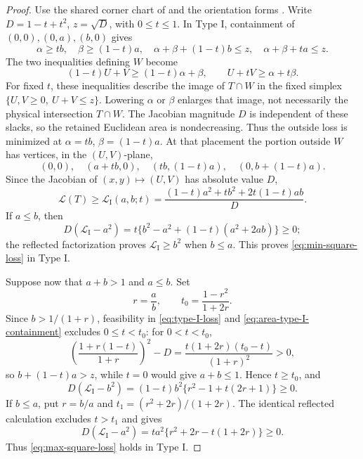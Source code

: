\begin{proof}
Use the shared corner chart of  and the
orientation forms .
Write $D=1-t+t^2$, $z=\sqrt D$, with $0\le t\le1$.
In Type I, containment of
$(0,0),(0,a),(b,0)$ gives
\begin{equation}
 \alpha\ge tb,\quad \beta\ge(1-t)a,
 \quad \alpha+\beta+(1-t)b\le z,
 \quad \alpha+\beta+ta\le z.                 \label{eq:area-type-I-containment}
\end{equation}
The two inequalities defining $W$ become
\[
 (1-t)U+V\ge(1-t)\alpha+\beta,
 \qquad U+tV\ge\alpha+t\beta.
\]
For fixed $t$, these inequalities describe the image of $T\cap W$ in the
fixed simplex $\{U,V\ge0,\ U+V\le z\}$. Lowering $\alpha$ or $\beta$
enlarges that image, not necessarily the physical intersection $T\cap W$.
The Jacobian magnitude $D$ is independent of these slacks, so the retained
Euclidean area is nondecreasing. Thus the outside loss is minimized at
$\alpha=tb$, $\beta=(1-t)a$. At that placement the portion outside $W$
has vertices, in the $(U,V)$-plane,
\[
 (0,0),\quad(a+tb,0),\quad(tb,(1-t)a),
 \quad(0,b+(1-t)a).
\]
Since the Jacobian of $(x,y)\mapsto(U,V)$ has absolute value $D$,
\begin{equation}
 \mathcal L(T)\ge \mathcal L_{\mathrm I}(a,b;t)
 =\frac{(1-t)a^2+tb^2+2t(1-t)ab}{D}.          \label{eq:type-I-loss}
\end{equation}
If $a\le b$, then
\[
 D(\mathcal L_{\mathrm I}-a^2)
 =t\{b^2-a^2+(1-t)(a^2+2ab)\}\ge0;
\]
the reflected factorization proves $\mathcal L_{\mathrm I}\ge b^2$ when $b\le a$.
This proves \eqref{eq:min-square-loss} in Type I.

Suppose now that $a+b>1$ and $a\le b$.  Set
\[
 r=\frac ab,\qquad t_0=\frac{1-r^2}{1+2r}.
\]
Since $b>1/(1+r)$, feasibility in \eqref{eq:type-I-loss} and
\eqref{eq:area-type-I-containment} excludes
$0\le t<t_0$: for $0<t<t_0$,
\[
 \left(\frac{1+r(1-t)}{1+r}\right)^2-D
 =\frac{t(1+2r)(t_0-t)}{(1+r)^2}>0,
\]
so $b+(1-t)a>z$, while $t=0$ would give $a+b\le1$.  Hence $t\ge t_0$, and
\[
 D(\mathcal L_{\mathrm I}-b^2)
 =(1-t)b^2\{r^2-1+t(2r+1)\}\ge0.
\]
If $b\le a$, put $r=b/a$ and
$t_1=(r^2+2r)/(1+2r)$.  The identical reflected calculation excludes
$t>t_1$ and gives
\[
 D(\mathcal L_{\mathrm I}-a^2)
 =ta^2\{r^2+2r-t(1+2r)\}\ge0.
\]
Thus \eqref{eq:max-square-loss} holds in Type I.


\end{proof}
